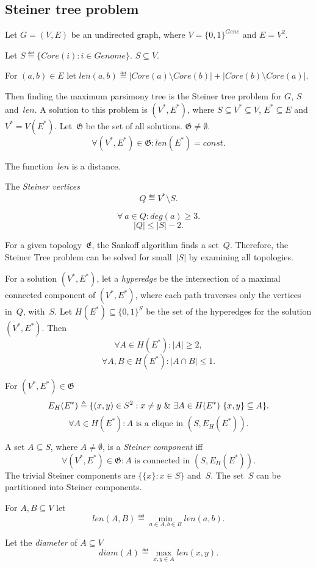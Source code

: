 \documentclass[10pt,a4paper]{article}
\theoremstyle{plain} \newtheorem{Lem}{Lemma}
\begin{document}
\subsection {Steiner tree problem}

Let $G = (V,E)$ be an undirected graph, where $V = \{0,1\}^{Gene}$ and $E = V^2$.

Let $S \eqdef \{Core(i): i \in Genome \}$. $S \subseteq V$.

For $(a,b) \in E$ let $len(a,b) \eqdef |Core(a) \setminus Core(b)| + |Core(b) \setminus Core(a)|$.

Then finding the maximum parsimony tree is the Steiner tree problem for $G$, $S$ and~$len$.
A solution to this problem is $(V^*, E^*)$, where $S \subseteq V^* \subseteq V$, $E^* \subseteq E$ and $V^* = V(E^*)$.
Let~$\mathfrak G$ be the set of all solutions. $\mathfrak G \ne \emptyset$.
$$ \forall (V^*,E^*) \in \mathfrak G : len(E^*) = const. $$

The function~$len$ is a distance.

The {\em Steiner vertices}
$$ Q \eqdef V^* \setminus S. $$

$$ \forall \ a \in Q : deg(a) \ge 3. $$
$$ |Q| \le |S| - 2. $$

For a given topology~$\mathfrak E$, the Sankoff algorithm finds a set~$Q$.
Therefore, the Steiner Tree problem can be solved for small~$|S|$ by examining all topologies.

For a solution $(V^*, E^*)$, let a {\em hyperedge} be the intersection of a maximal connected component of $(V^*, E^*)$, where each path traverses only the vertices in~$Q$, with~$S$.
Let $H(E^*) \subseteq \{0,1\}^S$ be the set of the hyperedges for the solution $(V^*, E^*)$.
Then
$$ \forall A \in H(E^*) : |A| \ge 2, $$
$$ \forall A,B \in H(E^*) : |A \cap B| \le 1. $$

For $(V^*, E^*) \in \mathfrak G$
$$ E_H(E^*) \triangleq \{(x,y) \in S^2 : x \ne y \ \& \  \exists A \in H(E^*) \ \{x,y\} \subseteq A\}. $$
$$ \forall A \in H(E^*) : A \text{ is a clique in } (S, E_H(E^*)). $$

A set $A \subseteq S$, where $A \ne \emptyset$, is a {\em Steiner component} iff
$$ \forall (V^*, E^*) \in \mathfrak G : A \text{ is connected in } (S, E_H(E^*)). $$
The trivial Steiner components are $\{\{x\}: x \in S\}$ and~$S$.
The set~$S$ can be partitioned into Steiner components.

For $A, B \subseteq V$ let
$$ len(A,B) \eqdef \min_{a \in A, b \in B} len(a,b). $$

Let the {\em diameter} of $A \subseteq V$
$$ diam(A) \eqdef \max_{x,y \in A} len(x,y). $$
\end{document}
